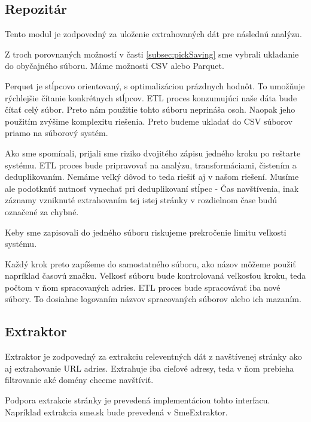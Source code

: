 

\subsection{Repozitár}
Tento modul je zodpovedný za uloženie extrahovaných dát pre následnú analýzu. 

Z troch porovnaných možností v časti \ref{subsec:pickSaving} sme vybrali ukladanie do obyčajného súboru. Máme možnosti CSV alebo Parquet. 

Perquet je stĺpcovo orientovaný, s optimalizáciou prázdnych hodnôt. To umožňuje rýchlejšie čítanie konkrétnych stĺpcov. ETL proces konzumujúci naše dáta bude čítať celý súbor. Preto nám použitie tohto súboru neprináša osoh. Naopak jeho použitím zvýšime komplexitu riešenia. Preto budeme ukladať do CSV súborov priamo na súborový systém. 

Ako sme spomínali, prijali sme riziko dvojitého zápisu jedného kroku po reštarte systému. ETL proces bude pripravovať na analýzu, transformáciami, čistením a deduplikovaním. Nemáme veľký dôvod to teda riešiť aj v našom riešení. Musíme ale podotknúť nutnosť vynechať pri deduplikovaní stĺpec - Čas navštívenia, inak záznamy vzniknuté extrahovaním tej istej stránky v rozdielnom čase budú označené za chybné. 

Keby sme zapisovali do jedného súboru riskujeme prekročenie limitu veľkosti systému.

Každý krok preto zapíšeme do samostatného súboru, ako názov môžeme použiť napríklad časovú značku. Veľkosť súboru bude kontrolovaná veľkosťou kroku, teda počtom v ňom spracovaných adries. ETL proces bude spracovávať iba nové súbory. To dosiahne logovaním názvov spracovaných súborov alebo ich mazaním. 

\subsection{Extraktor}
Extraktor je zodpovedný za extrakciu releventných dát z navštívenej stránky ako aj extrahovanie URL adries. Extrahuje iba cieľové adresy, teda v ňom prebieha filtrovanie aké domény chceme navštíviť. 

Podpora extrakcie stránky je prevedená implementáciou tohto interfacu. Napríklad extrakcia sme.sk bude prevedená v SmeExtraktor.




